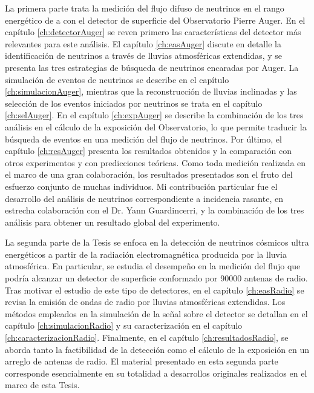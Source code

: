 La primera parte trata la medici\'on del flujo difuso de neutrinos en el rango energ\'etico de  a  con el detector de superficie del Observatorio Pierre Auger. En el cap\'itulo \ref{ch:detectorAuger} se reven primero las caracter\'isticas del detector m\'as relevantes para este análisis.
El cap\'itulo \ref{ch:easAuger} discute en detalle la identificación de neutrinos a través de lluvias atmosf\'ericas extendidas, y se presenta las tres estrategias de búsqueda de neutrinos encaradas por Auger. La simulación de eventos de neutrinos se describe en el cap\'itulo \ref{ch:simulacionAuger}, mientras que la reconstrucci\'on de lluvias inclinadas y las selecci\'on de los eventos iniciados por neutrinos se trata en el cap\'itulo \ref{ch:selAuger}.
En el cap\'itulo \ref{ch:expAuger} se describe la combinación de los tres análisis en el c\'alculo de la exposici\'on del Observatorio, lo que permite traducir la búsqueda de eventos en una medición del flujo de neutrinos. Por último, el capítulo \ref{ch:resAuger} presenta los resultados obtenidos y la comparación con otros experimentos y con predicciones te\'oricas. Como toda medición realizada en el marco de una gran colaboración, los resultados presentados son el fruto del esfuerzo conjunto de muchas individuos. Mi contribución particular fue el desarrollo del análisis de neutrinos correspondiente a incidencia rasante, en estrecha colaboración con el Dr. Yann Guardincerri, y la combinación de los tres análisis para obtener un resultado global del experimento.

La segunda parte de la Tesis se enfoca en la detecci\'on de neutrinos c\'osmicos ultra energ\'eticos a partir de la radiaci\'on electromagn\'etica producida por la lluvia atmosf\'erica. En particular, se estudia el desempe\~no en la medici\'on del flujo que podr\'ia alcanzar un detector de superficie conformado por 90000 antenas de radio.
Tras motivar el estudio de este tipo de detectores, en el cap\'itulo \ref{ch:easRadio}
se revisa la emisi\'on de ondas de radio por lluvias atmosf\'ericas extendidas.
Los m\'etodos empleados en la simulaci\'on de la se\~nal sobre el detector se detallan en el cap\'itulo \ref{ch:simulacionRadio} y su caracterizaci\'on en el cap\'itulo \ref{ch:caracterizacionRadio}.
Finalmente, en el cap\'itulo \ref{ch:resultadosRadio}, se aborda tanto la factibilidad de la detecci\'on como el c\'alculo de la exposici\'on en un arreglo de antenas de radio. El material presentado en esta segunda parte corresponde esencialmente en su totalidad a desarrollos originales realizados en el marco de esta Tesis.

